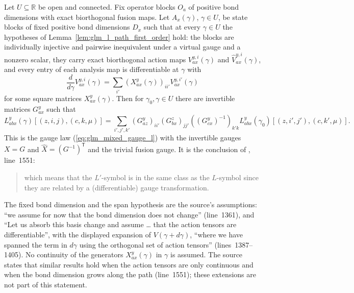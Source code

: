 \begin{theorem}
    \leanok
    \label{thm:glm_l_path_invariance}
    Let $U\subseteq\mathbb R$ be open and connected. Fix operator blocks
    $O_a$ of positive bond dimensions with exact biorthogonal fusion maps.
    Let $A_x(\gamma)$, $\gamma\in U$, be state blocks of fixed positive bond
    dimensions $D_x$ such that at every $\gamma\in U$ the hypotheses of
    Lemma~\ref{lem:glm_l_path_first_order} hold: the blocks are individually
    injective and pairwise inequivalent under a virtual gauge and a nonzero
    scalar, they carry exact biorthogonal action maps
    $V_{ax}^{y,i}(\gamma)$ and $\widehat V_{ax}^{y,i}(\gamma)$, and every
    entry of each analysis map is differentiable at $\gamma$ with
    \[
        \frac{d}{d\gamma}V_{ax}^{y,i}(\gamma)
        =\sum_{i'}(X_{ax}^y(\gamma))_{ii'}V_{ax}^{y,i'}(\gamma)
    \]
    for some square matrices $X_{ax}^y(\gamma)$. Then for
    $\gamma_0,\gamma\in U$ there are invertible matrices $G_{ax}^y$ such
    that
    \[
        L_{abx}^y(\gamma)[(z,i,j),(c,k,\mu)]=\sum_{i',j',k'}
        (G_{az}^y)_{ii'}(G_{bx}^z)_{jj'}((G_{cx}^y)^{-1})_{k'k}
        L_{abx}^y(\gamma_0)[(z,i',j'),(c,k',\mu)].
    \]
    This is the gauge law (\ref{eq:glm_mixed_gauge_l}) with the invertible
    gauges $X=G$ and $\widehat X=(G^{-1})^{\mathsf T}$ and the trivial fusion
    gauge. It is the conclusion of \cite[Section~5]{GarreRubio2023MPOSym},
    line~1551:
    \begin{quote}
        which means that the ${L}'$-symbol is in the same class as the
        ${L}$-symbol since they are related by a (differentiable) gauge
        transformation.
    \end{quote}
    The fixed bond dimension and the span hypothesis are the source's
    assumptions: ``we assume for now that the bond dimension does not
    change'' (line~1361), and ``Let us absorb this basis change and assume
    \ldots{} that the action tensors are differentiable'', with the displayed
    expansion of $V(\gamma+d\gamma)$, ``where we have spanned the term in
    $d\gamma$ using the orthogonal set of action tensors''
    (lines~1387--1405). No continuity of the generators $X_{ax}^y(\gamma)$ in
    $\gamma$ is assumed. The source states that similar results hold when the action
    tensors are only continuous and when the bond dimension grows along the
    path (line~1551); these extensions are not part of this statement.
\end{theorem}
